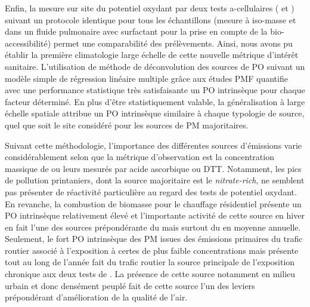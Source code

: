 Enfin, la mesure sur site du potentiel oxydant par deux tests a-cellulaires (\POAA{} et
\PODTT) suivant un protocole identique pour tous les échantillons (mesure à iso-masse et
dans un fluide pulmonaire avec surfactant pour la prise en compte de la bio-accessibilité) permet une
comparabilité des prélèvements. Ainsi, nous avons pu établir la première climatologie large échelle
de cette nouvelle métrique d'intérêt sanitaire.
L'utilisation de méthode de déconvolution des sources de PO suivant un modèle simple de
régression linéaire multiple grâce aux études PMF quantifie avec une performance
statistique très satisfaisante un PO intrinsèque pour chaque facteur déterminé.
En plus d'être statistiquement valable, la généralisation à large échelle spatiale
attribue un PO intrinsèque similaire à chaque typologie de source, quel que soit le site
considéré pour les sources de PM majoritaires.

Suivant cette méthodologie, l'importance des différentes sources d'émissions varie
considérablement selon que la métrique d'observation est la concentration massique de
\PMdix{} ou leurs \POv{} mesurés par acide ascorbique ou DTT. Notamment, les pics de
pollution printaniers, dont la source majoritaire est le \textit{nitrate-rich}, ne
semblent
pas présenter de réactivité particulière au regard des tests de potentiel oxydant. En
revanche, la combustion de biomasse pour le chauffage résidentiel présente un PO
intrinsèque relativement élevé et l'importante activité de cette source en hiver en fait l'une des
sources prépondérante du \PODTTv{} mais surtout du \POAAv{} en moyenne annuelle.  Seulement,
le fort PO intrinsèque des PM issues des émissions primaires du trafic routier associé à
l'exposition à certes de plus faible concentrations mais présente tout au long de l'année
fait du trafic routier la source principale de l'exposition chronique aux deux tests de
\POv.  La présence de cette source notamment en milieu urbain et donc densément
peuplé fait de cette source l'un des leviers prépondérant d'amélioration de la qualité de
l'air.

